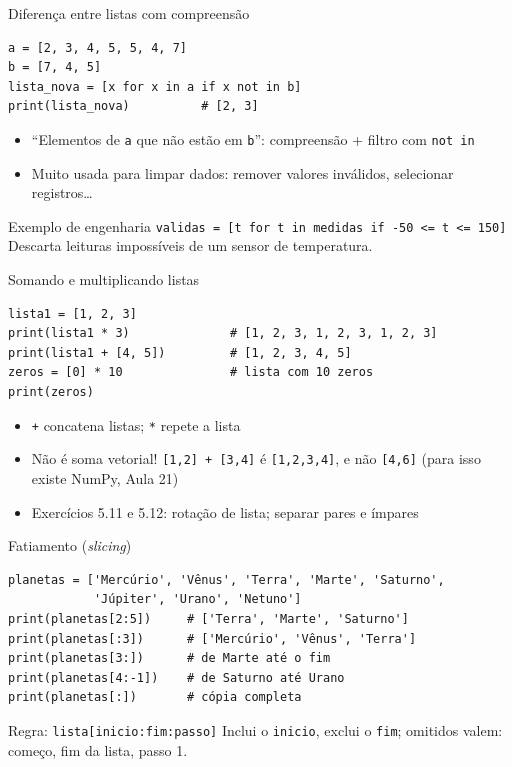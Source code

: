 \documentclass[aspectratio=169,10pt,t]{beamer}
\begin{document}
\begin{frame}[fragile]{Diferença entre listas com compreensão}
\begin{lstlisting}
a = [2, 3, 4, 5, 5, 4, 7]
b = [7, 4, 5]
lista_nova = [x for x in a if x not in b]
print(lista_nova)          # [2, 3]
\end{lstlisting}
  \begin{itemize}
    \item ``Elementos de \texttt{a} que \alert{não} estão em \texttt{b}'': compreensão + filtro com \texttt{not in}
    \item Muito usada para limpar dados: remover valores inválidos, selecionar registros\ldots
  \end{itemize}
  \begin{exampleblock}{Exemplo de engenharia}
    \texttt{validas = [t for t in medidas if -50 <= t <= 150]}\\
    \footnotesize Descarta leituras impossíveis de um sensor de temperatura.
  \end{exampleblock}
\end{frame}

\begin{frame}[fragile]{Somando e multiplicando listas}
\begin{lstlisting}
lista1 = [1, 2, 3]
print(lista1 * 3)              # [1, 2, 3, 1, 2, 3, 1, 2, 3]
print(lista1 + [4, 5])         # [1, 2, 3, 4, 5]
zeros = [0] * 10               # lista com 10 zeros
print(zeros)
\end{lstlisting}
  \begin{itemize}
    \item \texttt{+} \alert{concatena} listas; \texttt{*} \alert{repete} a lista
    \item Não é soma vetorial! \texttt{[1,2] + [3,4]} é \texttt{[1,2,3,4]}, e não \texttt{[4,6]} (para isso existe NumPy, Aula 21)
    \item Exercícios 5.11 e 5.12: rotação de lista; separar pares e ímpares
  \end{itemize}
\end{frame}

\begin{frame}[fragile]{Fatiamento (\emph{slicing})}
\begin{lstlisting}
planetas = ['Mercúrio', 'Vênus', 'Terra', 'Marte', 'Saturno',
            'Júpiter', 'Urano', 'Netuno']
print(planetas[2:5])     # ['Terra', 'Marte', 'Saturno']
print(planetas[:3])      # ['Mercúrio', 'Vênus', 'Terra']
print(planetas[3:])      # de Marte até o fim
print(planetas[4:-1])    # de Saturno até Urano
print(planetas[:])       # cópia completa
\end{lstlisting}
  \begin{block}{Regra: \texttt{lista[inicio:fim:passo]}}
    Inclui o \texttt{inicio}, \alert{exclui} o \texttt{fim}; omitidos valem: começo, fim da lista, passo 1.
  \end{block}
\end{frame}
\end{document}
